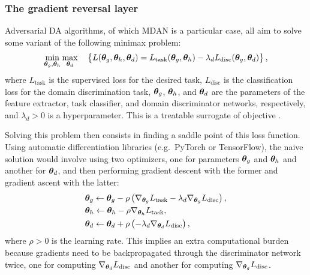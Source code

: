\subsubsection{The gradient reversal layer}
\label{sec:da_sensors_grad_rev}
Adversarial DA algorithms, of which MDAN is a particular case, all aim to solve some variant of the following minimax problem:
\begin{equation}
	\min_{{\bm{\theta}}_g, {\bm{\theta}}_h} \max_{{\bm{\theta}}_d} \quad \left \lbrace L({\bm{\theta}}_g, {\bm{\theta}}_h, {\bm{\theta}}_d) =  L_{\text{task}}({\bm{\theta}}_g, {\bm{\theta}}_h) - \lambda_d L_{\text{disc}}({\bm{\theta}}_g, {\bm{\theta}}_d) \right \rbrace,
\end{equation}
where $L_{\text{task}}$ is the supervised loss for the desired task, $L_{\text{disc}}$ is the classification loss for the domain discrimination task, ${\bm{\theta}}_g$, ${\bm{\theta}}_h$, and ${\bm{\theta}}_d$ are the parameters of the feature extractor, task classifier, and domain discriminator networks, respectively, and $\lambda_d > 0$ is a hyperparameter. This is a treatable surrogate of objective .

Solving this problem then consists in finding a saddle point of this loss function. Using automatic differentiation libraries (e.g.\ PyTorch or TensorFlow), the naive solution would involve using two optimizers, one for parameters ${\bm{\theta}}_g$ and ${\bm{\theta}}_h$ and another for ${\bm{\theta}}_d$, and then performing gradient descent with the former and gradient ascent with the latter:
\begin{align}
	&{\bm{\theta}}_g \leftarrow {\bm{\theta}}_g - \rho \left(\nabla_{{\bm{\theta}}_g}L_{\text{task}} - \lambda_d \nabla_{{\bm{\theta}}_g} L_{\text{disc}}\right), \label{eq:grad_feature_extractor}\\
	&{\bm{\theta}}_h \leftarrow {\bm{\theta}}_h - \rho \nabla_{{\bm{\theta}}_h}L_{\text{task}}, \label{eq:grad_task_class}\\
	&{\bm{\theta}}_d \leftarrow {\bm{\theta}}_d + \rho \left(-\lambda_d \nabla_{{\bm{\theta}}_d}L_{\text{disc}}\right), \label{eq:grad_discriminator}
\end{align}
where $\rho>0$ is the learning rate. This implies an extra computational burden because gradients need to be backpropagated through the discriminator network twice, one for computing $\nabla_{{\bm{\theta}}_d} L_{\text{disc}}$ and another for computing $\nabla_{{\bm{\theta}}_g} L_{\text{disc}}$.

